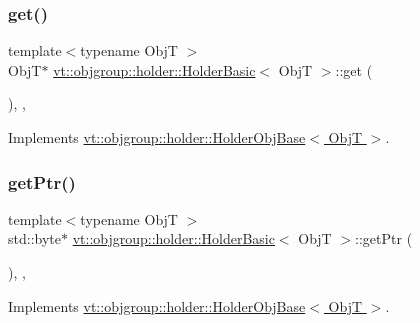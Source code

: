 \subsubsection{\texorpdfstring{get()}{get()}}
{\footnotesize\ttfamily template$<$typename ObjT $>$ \\
ObjT$\ast$ \hyperlink{structvt_1_1objgroup_1_1holder_1_1_holder_basic}{vt\+::objgroup\+::holder\+::\+Holder\+Basic}$<$ ObjT $>$\+::get (\begin{DoxyParamCaption}{ }\end{DoxyParamCaption})\hspace{0.3cm}{\ttfamily [inline]}, {\ttfamily [override]}, {\ttfamily [virtual]}}



Implements \hyperlink{structvt_1_1objgroup_1_1holder_1_1_holder_obj_base_a4b350b0126259d31a62fd426a08f6698}{vt\+::objgroup\+::holder\+::\+Holder\+Obj\+Base$<$ Obj\+T $>$}.

\mbox{\label{structvt_1_1objgroup_1_1holder_1_1_holder_basic_a857b56b22964a3524169f6fa30307d65}} 
\subsubsection{\texorpdfstring{get\+Ptr()}{getPtr()}}
{\footnotesize\ttfamily template$<$typename ObjT $>$ \\
std\+::byte$\ast$ \hyperlink{structvt_1_1objgroup_1_1holder_1_1_holder_basic}{vt\+::objgroup\+::holder\+::\+Holder\+Basic}$<$ ObjT $>$\+::get\+Ptr (\begin{DoxyParamCaption}{ }\end{DoxyParamCaption})\hspace{0.3cm}{\ttfamily [inline]}, {\ttfamily [override]}, {\ttfamily [virtual]}}



Implements \hyperlink{structvt_1_1objgroup_1_1holder_1_1_holder_obj_base_adbb4d702b76306f185e29388961e1e2d}{vt\+::objgroup\+::holder\+::\+Holder\+Obj\+Base$<$ Obj\+T $>$}.

\mbox{\label{structvt_1_1objgroup_1_1holder_1_1_holder_basic_ae0e03732280c6c1cf44f9ff8f24426c2}} 
